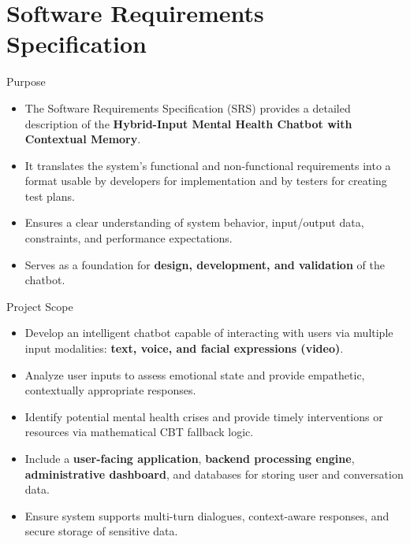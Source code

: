 \documentclass{beamer}
\begin{document}
\section{Software Requirements Specification}
\begin{frame}{Purpose}
    \justifying
    \begin{itemize}
        \item The Software Requirements Specification (SRS) provides a detailed description of the \textbf{Hybrid-Input Mental Health Chatbot with Contextual Memory}.
        \item It translates the system's functional and non-functional requirements into a format usable by developers for implementation and by testers for creating test plans.
        \item Ensures a clear understanding of system behavior, input/output data, constraints, and performance expectations.
        \item Serves as a foundation for \textbf{design, development, and validation} of the chatbot.
    \end{itemize}
\end{frame}

\begin{frame}{Project Scope}
    \justifying
    \begin{itemize}
        \item Develop an intelligent chatbot capable of interacting with users via multiple input modalities: \textbf{text, voice, and facial expressions (video)}.
        \item Analyze user inputs to assess emotional state and provide empathetic, contextually appropriate responses.
        \item Identify potential mental health crises and provide timely interventions or resources via mathematical CBT fallback logic.
        \item Include a \textbf{user-facing application}, \textbf{backend processing engine}, \textbf{administrative dashboard}, and databases for storing user and conversation data.
        \item Ensure system supports multi-turn dialogues, context-aware responses, and secure storage of sensitive data.
    \end{itemize}
\end{frame}
\end{document}
